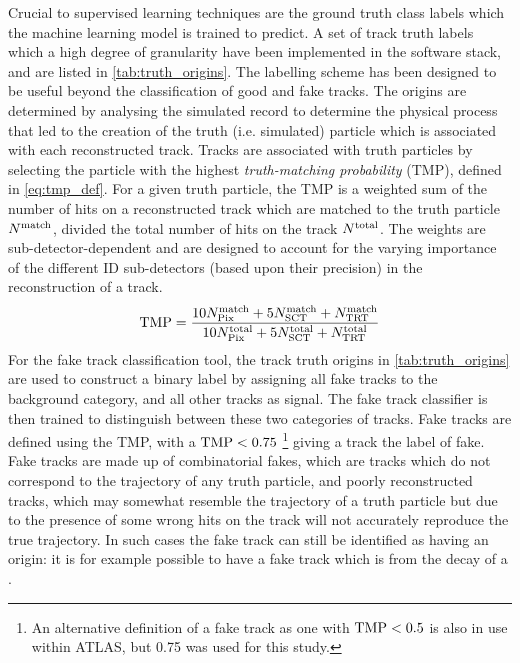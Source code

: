 Crucial to supervised learning techniques are the ground truth class labels which the machine learning model is trained to predict.
A set of track truth labels which a high degree of granularity have been implemented in the \ATLAS software stack, and are listed in \cref{tab:truth_origins}.
The labelling scheme has been designed to be useful beyond the classification of good and fake tracks.
The origins are determined by analysing the simulated record to determine the physical process that led to the creation of the truth (i.e. simulated) particle which is  associated with each reconstructed track.
Tracks are associated with truth particles by selecting the particle with the highest \textit{truth-matching probability} (TMP), defined in \cref{eq:tmp_def}.
For a given truth particle, the TMP is a weighted sum of the number of hits on a reconstructed track which are matched to the truth particle $N^{\textnormal{match}}$, divided the total number of hits on the track $N^{\textnormal{total}}$.
The weights are sub-detector-dependent and are designed to account for the varying importance of the different ID sub-detectors (based upon their precision) in the reconstruction of a track.
%
\begin{equation}\label{eq:tmp_def}
    \textnormal{TMP} = 
    \frac{
        10 N_{\textnormal{Pix}}^{\textnormal{match}} + 
        5  N_{\textnormal{SCT}}^{\textnormal{match}} + 
           N_{\textnormal{TRT}}^{\textnormal{match}}
        }{
        10 N_{\textnormal{Pix}}^{\textnormal{total}} + 
        5  N_{\textnormal{SCT}}^{\textnormal{total}} + 
            N_{\textnormal{TRT}}^{\textnormal{total}}
        }
\end{equation}
%
For the fake track classification tool, the track truth origins in \cref{tab:truth_origins} are used to construct a binary label by assigning all fake tracks to the background category, and all other tracks as signal.
The fake track classifier is then trained to distinguish between these two categories of tracks.
Fake tracks are defined using the TMP, with a $\textnormal{TMP} < 0.75$
\footnote{An alternative definition of a fake track as one with $\textnormal{TMP} < 0.5$ is also in use within ATLAS, but 0.75 was used for this study.}
giving a track the label of fake.
Fake tracks are made up of combinatorial fakes, which are tracks which do not correspond to the trajectory of any truth particle, and poorly reconstructed tracks, which may somewhat resemble the trajectory of a truth particle but due to the presence of some wrong hits on the track will not accurately reproduce the true trajectory.
In such cases the fake track can still be identified as having an origin: it is for example possible to have a fake track which is from the decay of a \bhadron.


